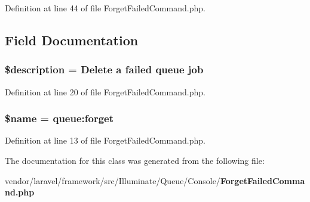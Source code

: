 Definition at line 44 of file Forget\+Failed\+Command.\+php.



\subsection{Field Documentation}
\subsubsection[{\$description}]{\setlength{\rightskip}{0pt plus 5cm}\$description = \textquotesingle{}Delete {\bf a} failed {\bf queue} job\textquotesingle{}\hspace{0.3cm}{\ttfamily [protected]}}\label{class_illuminate_1_1_queue_1_1_console_1_1_forget_failed_command_a87b032cba06009e3467abf1c8018d960}


Definition at line 20 of file Forget\+Failed\+Command.\+php.

\subsubsection[{\$name}]{\setlength{\rightskip}{0pt plus 5cm}\${\bf name} = \textquotesingle{}queue\+:forget\textquotesingle{}\hspace{0.3cm}{\ttfamily [protected]}}\label{class_illuminate_1_1_queue_1_1_console_1_1_forget_failed_command_ab2fc40d43824ea3e1ce5d86dee0d763b}


Definition at line 13 of file Forget\+Failed\+Command.\+php.



The documentation for this class was generated from the following file\+:\begin{DoxyCompactItemize}
\item 
vendor/laravel/framework/src/\+Illuminate/\+Queue/\+Console/{\bf Forget\+Failed\+Command.\+php}\end{DoxyCompactItemize}
